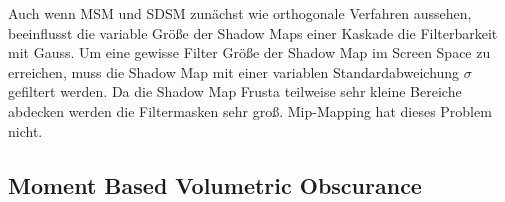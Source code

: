 \documentclass[runningheaders,a4paper]{llncs}
\begin{document}
Auch wenn MSM und SDSM zunächst wie orthogonale Verfahren aussehen, beeinflusst die variable Größe der Shadow Maps einer Kaskade die Filterbarkeit mit Gauss.
Um eine gewisse Filter Größe der Shadow Map im Screen Space zu erreichen, muss die Shadow Map mit einer variablen Standardabweichung $\sigma$ gefiltert werden.
Da die Shadow Map Frusta teilweise sehr kleine Bereiche abdecken werden die Filtermasken sehr groß.
Mip-Mapping hat dieses Problem nicht.


\subsection{Moment Based Volumetric Obscurance}
\begin{figure}[H]
	\centering
	

\end{figure}
\end{document}
